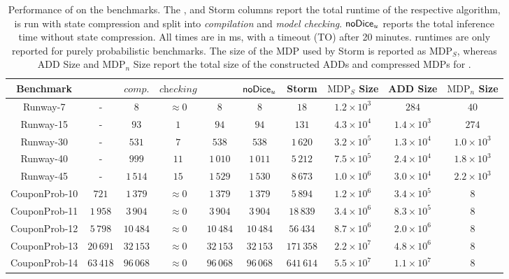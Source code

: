 \begin{table}
	\caption{Performance of \NDICE on the benchmarks.
		The \DICE, \NDICE and Storm columns report the total runtime of the respective algorithm, \NDICE is run with state compression and split into \textit{compilation} and \textit{model checking}.
		$\NDICE_u$ reports the total inference time without state compression.
		All times are in ms, with a timeout (TO) after 20 minutes.
		\DICE runtimes are only reported for purely probabilistic benchmarks.
		The size of the MDP used by Storm is reported as $\text{MDP}_S$, whereas ADD Size and $\text{MDP}_n$ Size report the total size of the constructed ADDs and compressed MDPs for \NDICE.}
		
	\label{tab:Ndet}
	\begin{adjustbox}{max width=\textwidth}
	\begin{tabu}{c | c | ccc | c | c | c c c}
		\toprule
		Benchmark & \DICE & $\textit{comp.}$ & $\textit{checking}$ & \NDICE & $\NDICE_u$ & Storm & $\text{MDP}_S$ Size & ADD Size & $\text{MDP}_n$ Size \\
		\midrule
		Runway-7 & - & $8$ & $\approx 0$ & {$8$} & {$8$} & $18$ & $1.2 \times 10^3$ & $284$ & $40$ \\
		Runway-15 & - & $93$ & {$1 $} & {$94 $} & {$94 $} & {$131$} & $4.3 \times 10^4$ & $1.4\times 10^3 $ & $274$ \\
		Runway-30 & - & $531$ & {$7 $} & {$538 $} & {$538$ } & {$1\,620$} & $3.2 \times 10^5$ & $1.3\times 10^4 $ & $1.0\times 10^3$ \\
		Runway-40 & - & $999$ & {$11 $} & {$1\,010$} & {$1\,011 $} & {$5\,212$} & $7.5 \times 10^5$ & $2.4\times 10^4 $ & $1.8\times 10^3$ \\
		Runway-45 & - & $1\,514$ & {$15$} & {$1\,529$} & {$1\,530 $} & {$8\,673$} & $1.0 \times 10^6$ & $3.0 \times 10^4 $ & $2.2\times 10^3$ \\
				
		\midrule
		CouponProb-10 & 
				$721$ &
		$1\,379$ & {$\approx 0$} & {$1\,379$} & 
		{$1\,379$} & $5\,894$ &
		 $1.2 \times 10^6$ & $3.4\times10^5$ & $8$ \\
		CouponProb-11 & 
				$1\,958$ & 
		$3\,904$ & {$\approx 0$} & {$3\,904$} & 
		{$3\,904$} & $18\,839$ &
		 $3.4 \times 10^6$ & $8.3\times10^5$ & $8$ \\
		CouponProb-12 & 
				$5\,798$ & 
		$10\,484$ & {$\approx 0$} & {$10\,484$} & 
		{$10\,484$} & $56\,434$ &
		 $8.7 \times 10^6$ & $2.0\times10^6$ & $8$ \\
		CouponProb-13 & 
				$20\,691$ & 
		$32\,153$ & {$\approx 0$} & {$32\,153$} & 
		{$32\,153$} & $171\,358$ &
		 $2.2 \times 10^7$ & $4.8\times10^6$ & $8$ \\
		CouponProb-14 & 
				$63\,418$ & 
		$96\,068$ & {$\approx 0$} & {$96\,068$} & 
		{$96\,068$} & $641\,614$ &
		 $5.5 \times 10^7$ & $1.1\times10^7$ & $8$ \\
		

\end{tabu}
\end{adjustbox}
\end{table}
